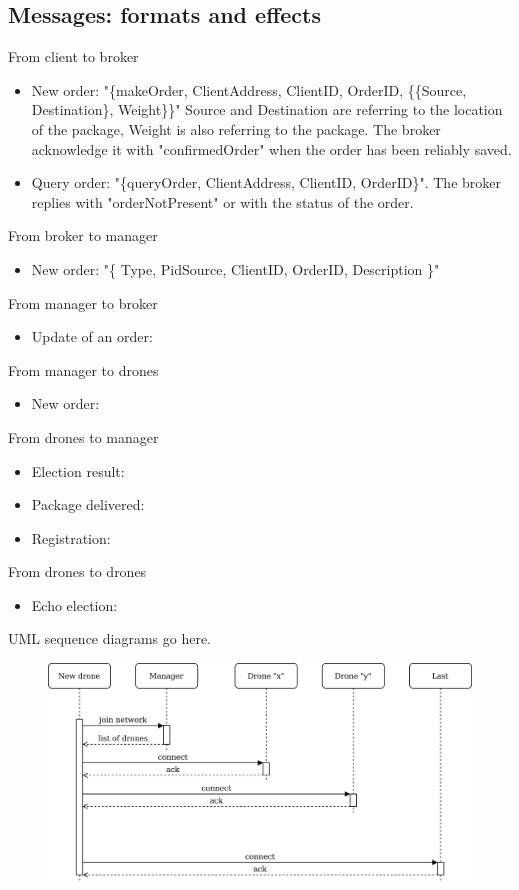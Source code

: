 \documentclass[a4paper, oneside]{memoir}
\begin{document}
\subsection{Messages: formats and effects}

From client to broker
\begin{itemize}
	\item New order: "\{makeOrder, ClientAddress, ClientID, OrderID, \{\{Source, Destination\}, Weight\}\}"
	Source and Destination are referring to the location of the package, Weight is also referring to the package. The broker acknowledge it with "confirmedOrder" when the order has been reliably saved.

	\item Query order: "\{queryOrder, ClientAddress, ClientID, OrderID\}". The broker replies with "orderNotPresent" or with the status of the order.
\end{itemize} \vspace{1em}
From broker to manager
\begin{itemize}
	\item New order: "\{ Type, PidSource, ClientID, OrderID, Description \}"
\end{itemize} \vspace{1em}
From manager to broker
\begin{itemize}
	\item Update of an order:
\end{itemize}\vspace{1em}
From manager to drones
\begin{itemize}
	\item New order:
\end{itemize} \vspace{1em}
From drones to manager
\begin{itemize}
	\item Election result:
	\item Package delivered:
	\item Registration:
\end{itemize} \vspace{1em}
From drones to drones
\begin{itemize}
	\item Echo election:
\end{itemize}

\vspace{1em}
UML sequence diagrams go here.
\begin{figure}[h!]
	\centering
	\includegraphics[width=\linewidth]{New-drone}
\end{figure}
\end{document}
